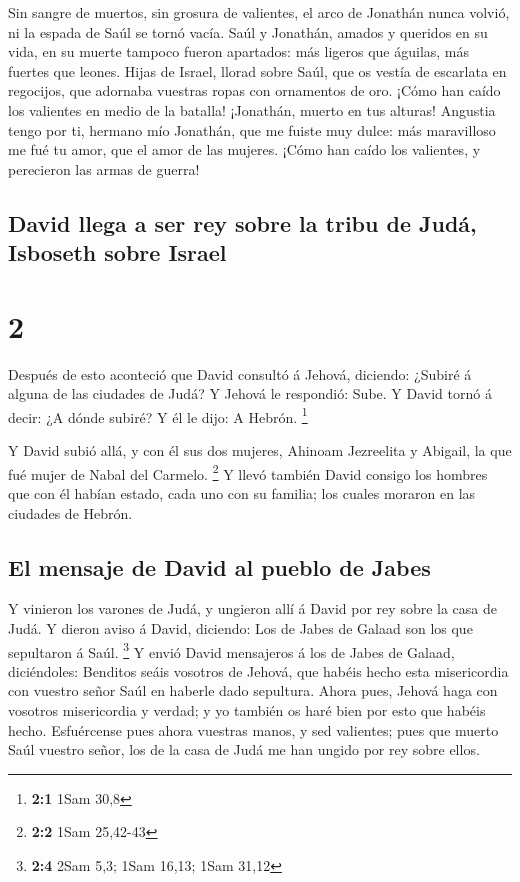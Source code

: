  Sin sangre de muertos, sin grosura de valientes, el arco
de Jonathán nunca volvió, ni la espada de Saúl se tornó vacía.
 Saúl y Jonathán, amados y queridos en su vida, en su
muerte tampoco fueron apartados: más ligeros que águilas, más fuertes
que leones.  Hijas de Israel, llorad sobre Saúl, que os
vestía de escarlata en regocijos, que adornaba vuestras ropas con
ornamentos de oro.  ¡Cómo han caído los valientes en medio
de la batalla! ¡Jonathán, muerto en tus alturas!  Angustia
tengo por ti, hermano mío Jonathán, que me fuiste muy dulce: más
maravilloso me fué tu amor, que el amor de las mujeres. 
¡Cómo han caído los valientes, y perecieron las armas de guerra!

\hypertarget{david-llega-a-ser-rey-sobre-la-tribu-de-juduxe1-isboseth-sobre-israel}{%
\subsection{David llega a ser rey sobre la tribu de Judá, Isboseth sobre
Israel}\label{david-llega-a-ser-rey-sobre-la-tribu-de-juduxe1-isboseth-sobre-israel}}

\hypertarget{section-1}{%
\section{2}\label{section-1}}

 Después de esto aconteció que David consultó á Jehová,
diciendo: ¿Subiré á alguna de las ciudades de Judá? Y Jehová le
respondió: Sube. Y David tornó á decir: ¿A dónde subiré? Y él le dijo: A
Hebrón. \footnote{\textbf{2:1} 1Sam 30,8}

 Y David subió allá, y con él sus dos mujeres, Ahinoam
Jezreelita y Abigail, la que fué mujer de Nabal del Carmelo. \footnote{\textbf{2:2}
  1Sam 25,42-43}  Y llevó también David consigo los hombres
que con él habían estado, cada uno con su familia; los cuales moraron en
las ciudades de Hebrón.

\hypertarget{el-mensaje-de-david-al-pueblo-de-jabes}{%
\subsection{El mensaje de David al pueblo de
Jabes}\label{el-mensaje-de-david-al-pueblo-de-jabes}}

 Y vinieron los varones de Judá, y ungieron allí á David por
rey sobre la casa de Judá. Y dieron aviso á David, diciendo: Los de
Jabes de Galaad son los que sepultaron á Saúl. \footnote{\textbf{2:4}
  2Sam 5,3; 1Sam 16,13; 1Sam 31,12}  Y envió David
mensajeros á los de Jabes de Galaad, diciéndoles: Benditos seáis
vosotros de Jehová, que habéis hecho esta misericordia con vuestro señor
Saúl en haberle dado sepultura.  Ahora pues, Jehová haga con
vosotros misericordia y verdad; y yo también os haré bien por esto que
habéis hecho.  Esfuércense pues ahora vuestras manos, y sed
valientes; pues que muerto Saúl vuestro señor, los de la casa de Judá me
han ungido por rey sobre ellos.

